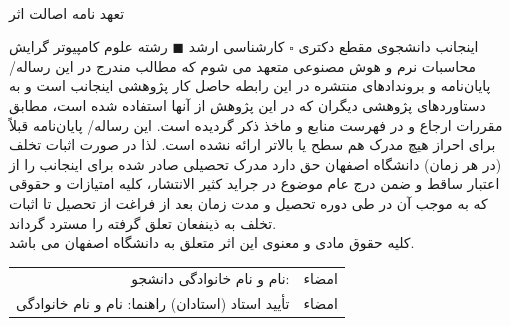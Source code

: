 \thispagestyle{empty}
\\[2cm]
{\large
	
}
\newpage
\thispagestyle{empty}
\newpage
\vspace*{1.7cm}
\thispagestyle{empty}
\begin{center}
	 تعهد نامه اصالت اثر
 \end{center}
 \noindent 
اینجانب
\textbf{\fullname} 
دانشجوی مقطع  دکتری 
$\square$   
کارشناسی ارشد
$\blacksquare$   
 رشته
علوم کامپیوتر
گرایش
 محاسبات نرم و هوش مصنوعی
متعهد می شوم که مطالب مندرج در این رساله/پایان‌نامه و بروندادهای منتشره در این رابطه حاصل کار پژوهشی اینجانب است و به دستاوردهای پژوهشی دیگران که در اين پژوهش از آنها استفاده شده است، مطابق مقررات ارجاع و در فهرست منابع و ماخذ ذکر گردیده است. این رساله/ پایان‌نامه قبلاً برای احراز هیچ مدرک هم سطح يا بالاتر ارائه نشده است. لذا در صورت اثبات تخلف (در هر زمان) دانشگاه اصفهان حق دارد مدرک تحصیلی صادر شده برای اینجانب را از اعتبار ساقط و ضمن درج عام موضوع در جراید کثیر الانتشار، کلیه امتیازات و حقوقی که به موجب آن در طی دوره تحصیل و مدت زمان بعد از فراغت از تحصیل تا اثبات تخلف به ذینفعان تعلق گرفته را مسترد گرداند.\\ 
کلیه حقوق مادی و معنوی این اثر متعلق به دانشگاه اصفهان می باشد.
\begin{table}[h!]
	\renewcommand\arraystretch{3} 	
	\begin{tabular}{rr}
	نام و نام خانوادگی دانشجو: 
		& \hspace{5cm}  امضاء
		   \\
	تأیید استاد (استادان) راهنما: نام و نام خانوادگی 
		&  \hspace{5cm} امضاء
		  \\
	\end{tabular}
\end{table}


 